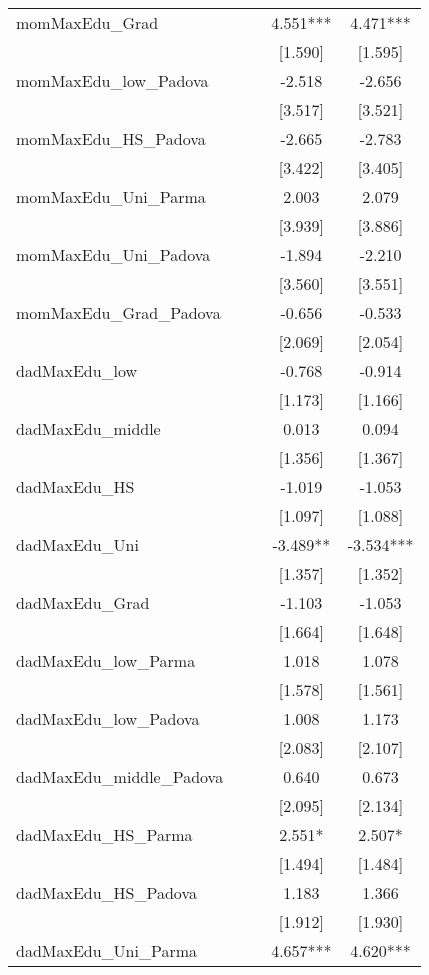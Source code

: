 \documentclass[]{article}
\begin{document}
\begin{tabular}{lcccc}
momMaxEdu\_Grad &  &  & 4.551*** & 4.471*** \\
 &  &  & [1.590] & [1.595] \\
momMaxEdu\_low\_Padova &  &  & -2.518 & -2.656 \\
 &  &  & [3.517] & [3.521] \\
momMaxEdu\_HS\_Padova &  &  & -2.665 & -2.783 \\
 &  &  & [3.422] & [3.405] \\
momMaxEdu\_Uni\_Parma &  &  & 2.003 & 2.079 \\
 &  &  & [3.939] & [3.886] \\
momMaxEdu\_Uni\_Padova &  &  & -1.894 & -2.210 \\
 &  &  & [3.560] & [3.551] \\
momMaxEdu\_Grad\_Padova &  &  & -0.656 & -0.533 \\
 &  &  & [2.069] & [2.054] \\
dadMaxEdu\_low &  &  & -0.768 & -0.914 \\
 &  &  & [1.173] & [1.166] \\
dadMaxEdu\_middle &  &  & 0.013 & 0.094 \\
 &  &  & [1.356] & [1.367] \\
dadMaxEdu\_HS &  &  & -1.019 & -1.053 \\
 &  &  & [1.097] & [1.088] \\
dadMaxEdu\_Uni &  &  & -3.489** & -3.534*** \\
 &  &  & [1.357] & [1.352] \\
dadMaxEdu\_Grad &  &  & -1.103 & -1.053 \\
 &  &  & [1.664] & [1.648] \\
dadMaxEdu\_low\_Parma &  &  & 1.018 & 1.078 \\
 &  &  & [1.578] & [1.561] \\
dadMaxEdu\_low\_Padova &  &  & 1.008 & 1.173 \\
 &  &  & [2.083] & [2.107] \\
dadMaxEdu\_middle\_Padova &  &  & 0.640 & 0.673 \\
 &  &  & [2.095] & [2.134] \\
dadMaxEdu\_HS\_Parma &  &  & 2.551* & 2.507* \\
 &  &  & [1.494] & [1.484] \\
dadMaxEdu\_HS\_Padova &  &  & 1.183 & 1.366 \\
 &  &  & [1.912] & [1.930] \\
dadMaxEdu\_Uni\_Parma &  &  & 4.657*** & 4.620*** \\

\end{tabular}
\end{document}
